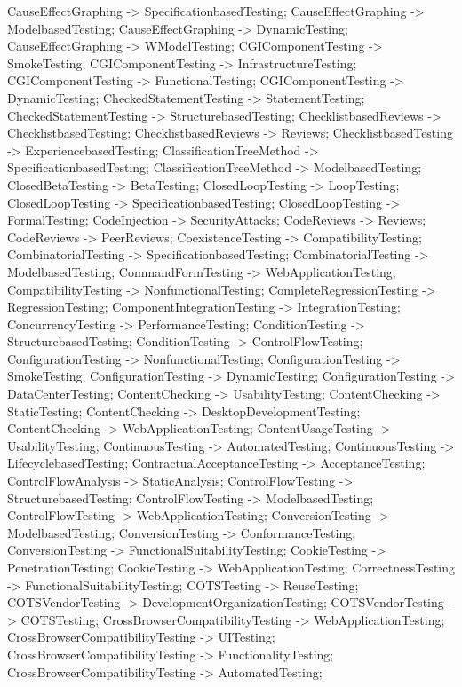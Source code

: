 \documentclass{article}
\begin{document}
{CauseEffectGraphing -> SpecificationbasedTesting;
CauseEffectGraphing -> ModelbasedTesting;
CauseEffectGraphing -> DynamicTesting;
CauseEffectGraphing -> WModelTesting;
CGIComponentTesting -> SmokeTesting;
CGIComponentTesting -> InfrastructureTesting;
CGIComponentTesting -> FunctionalTesting;
CGIComponentTesting -> DynamicTesting;
CheckedStatementTesting -> StatementTesting;
CheckedStatementTesting -> StructurebasedTesting;
ChecklistbasedReviews -> ChecklistbasedTesting;
ChecklistbasedReviews -> Reviews;
ChecklistbasedTesting -> ExperiencebasedTesting;
ClassificationTreeMethod -> SpecificationbasedTesting;
ClassificationTreeMethod -> ModelbasedTesting;
ClosedBetaTesting -> BetaTesting;
ClosedLoopTesting -> LoopTesting;
ClosedLoopTesting -> SpecificationbasedTesting;
ClosedLoopTesting -> FormalTesting;
CodeInjection -> SecurityAttacks;
CodeReviews -> Reviews;
CodeReviews -> PeerReviews;
CoexistenceTesting -> CompatibilityTesting;
CombinatorialTesting -> SpecificationbasedTesting;
CombinatorialTesting -> ModelbasedTesting;
CommandFormTesting -> WebApplicationTesting;
CompatibilityTesting -> NonfunctionalTesting;
CompleteRegressionTesting -> RegressionTesting;
ComponentIntegrationTesting -> IntegrationTesting;
ConcurrencyTesting -> PerformanceTesting;
ConditionTesting -> StructurebasedTesting;
ConditionTesting -> ControlFlowTesting;
ConfigurationTesting -> NonfunctionalTesting;
ConfigurationTesting -> SmokeTesting;
ConfigurationTesting -> DynamicTesting;
ConfigurationTesting -> DataCenterTesting;
ContentChecking -> UsabilityTesting;
ContentChecking -> StaticTesting;
ContentChecking -> DesktopDevelopmentTesting;
ContentChecking -> WebApplicationTesting;
ContentUsageTesting -> UsabilityTesting;
ContinuousTesting -> AutomatedTesting;
ContinuousTesting -> LifecyclebasedTesting;
ContractualAcceptanceTesting -> AcceptanceTesting;
ControlFlowAnalysis -> StaticAnalysis;
ControlFlowTesting -> StructurebasedTesting;
ControlFlowTesting -> ModelbasedTesting;
ControlFlowTesting -> WebApplicationTesting;
ConversionTesting -> ModelbasedTesting;
ConversionTesting -> ConformanceTesting;
ConversionTesting -> FunctionalSuitabilityTesting;
CookieTesting -> PenetrationTesting;
CookieTesting -> WebApplicationTesting;
CorrectnessTesting -> FunctionalSuitabilityTesting;
COTSTesting -> ReuseTesting;
COTSVendorTesting -> DevelopmentOrganizationTesting;
COTSVendorTesting -> COTSTesting;
CrossBrowserCompatibilityTesting -> WebApplicationTesting;
CrossBrowserCompatibilityTesting -> UITesting;
CrossBrowserCompatibilityTesting -> FunctionalityTesting;
CrossBrowserCompatibilityTesting -> AutomatedTesting;
}
\end{document}
